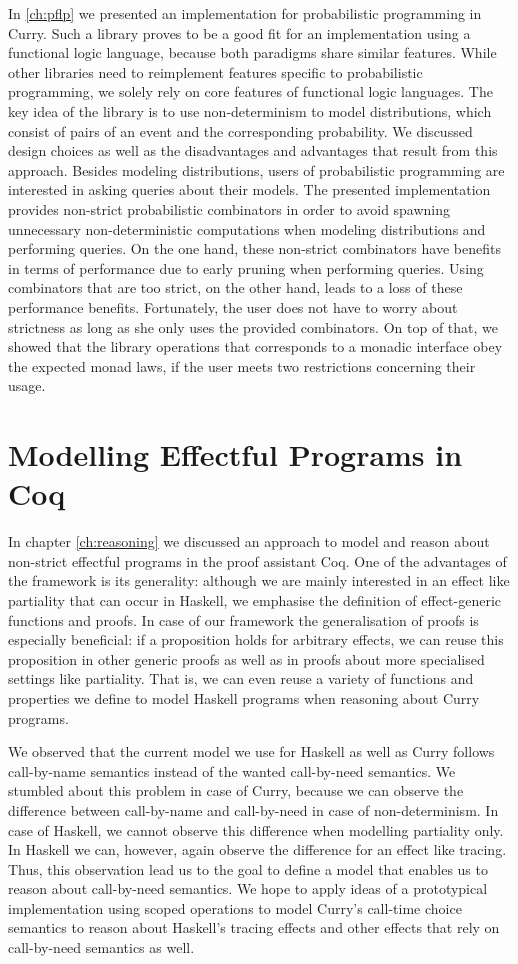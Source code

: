 In \autoref{ch:pflp} we presented an implementation for probabilistic programming in Curry.
Such a library proves to be a good fit for an implementation using a functional logic language, because both paradigms share similar features.
While other libraries need to reimplement features specific to probabilistic programming, we solely rely on core features of functional logic languages.
The key idea of the library is to use non-determinism to model distributions, which consist of pairs of an event and the corresponding probability.
We discussed design choices as well as the disadvantages and advantages that result from this approach.
Besides modeling distributions, users of probabilistic programming are interested in asking queries about their models.
The presented implementation provides non-strict probabilistic combinators in order to avoid spawning unnecessary non-deterministic computations when modeling distributions and performing queries.
On the one hand, these non-strict combinators have benefits in terms of performance due to early pruning when performing queries.
Using combinators that are too strict, on the other hand, leads to a loss of these performance benefits.
Fortunately, the user does not have to worry about strictness as long as she only uses the provided combinators.
On top of that, we showed that the library operations that corresponds to a monadic interface obey the expected monad laws, if the user meets two restrictions concerning their usage.

\section{Modelling Effectful Programs in Coq}

In chapter \autoref{ch:reasoning} we discussed an approach to model and reason about non-strict effectful programs in the proof assistant Coq.
One of the advantages of the framework is its generality: although we are mainly interested in an effect like partiality that can occur in Haskell, we emphasise the definition of effect-generic functions and proofs.
In case of our framework the generalisation of proofs is especially beneficial: if a proposition holds for arbitrary effects, we can reuse this proposition in other generic proofs as well as in proofs about more specialised settings like partiality.
That is, we can even reuse a variety of functions and properties we define to model Haskell programs when reasoning about Curry programs.

We observed that the current model we use for Haskell as well as Curry follows call-by-name semantics instead of the wanted call-by-need semantics.
We stumbled about this problem in case of Curry, because we can observe the difference between call-by-name and call-by-need in case of non-determinism.
In case of Haskell, we cannot observe this difference when modelling partiality only.
In Haskell we can, however, again observe the difference for an effect like tracing.
Thus, this observation lead us to the goal to define a model that enables us to reason about call-by-need semantics.
We hope to apply ideas of a prototypical implementation using scoped operations to model Curry's call-time choice semantics to reason about Haskell's tracing effects and other effects that rely on call-by-need semantics as well.
